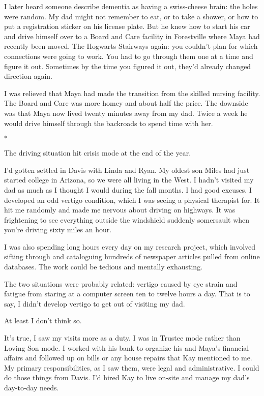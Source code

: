 \documentclass[12pt]{book}
\begin{document}
I later heard someone describe dementia as having a swiss-cheese brain: the holes were random. My dad might not remember to eat, or to take a shower, or how to put a registration sticker on his license plate. But he knew how to start his car and drive himself over to a Board and Care facility in Forestville where Maya had recently been moved. The Hogwarts Stairways again: you couldn't plan for which connections were going to work. You had to go through them one at a time and figure it out. Sometimes by the time you figured it out, they'd already changed direction again.

I was relieved that Maya had made the transition from the skilled nursing facility. The Board and Care was more homey and about half the price. The downside was that Maya now lived twenty minutes away from my dad. Twice a week he would drive himself through the backroads to spend time with her.

\begin{center}$*$\end{center}

The driving situation hit crisis mode at the end of the year.

I'd gotten settled in Davis with Linda and Ryan. My oldest son Miles had just started college in Arizona, so we were all living in the West. I hadn't visited my dad as much as I thought I would during the fall months. I had good excuses. I developed an odd vertigo condition, which I was seeing a physical therapist for. It hit me randomly and made me nervous about driving on highways. It was frightening to see everything outside the windshield suddenly somersault when you're driving sixty miles an hour.

I was also spending long hours every day on my research project, which involved sifting through and cataloguing hundreds of newspaper articles pulled from online databases. The work could be tedious and mentally exhausting.

The two situations were probably related: vertigo caused by eye strain and fatigue from staring at a computer screen ten to twelve hours a day. That is to say, I didn't develop vertigo to get out of visiting my dad.

At least I don't think so.

It's true, I saw my visits more as a duty. I was in Trustee mode rather than Loving Son mode. I worked with his bank to organize his and Maya's financial affairs and followed up on bills or any house repairs that Kay mentioned to me. My primary responsibilities, as I saw them, were legal and administrative. I could do those things from Davis. I'd hired Kay to live on-site and manage my dad's day-to-day needs.
\end{document}
